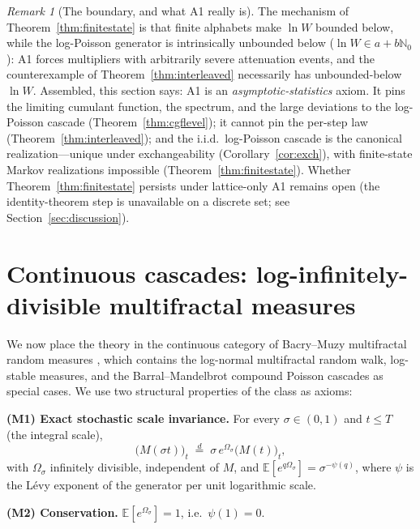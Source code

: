 \documentclass[12pt]{amsart}
\theoremstyle{definition}
\theoremstyle{remark}
\newtheorem*{remark}{Remark}
\begin{document}
\begin{remark}[The boundary, and what A1 really is]
The mechanism of Theorem~\ref{thm:finitestate} is that finite
alphabets make $\ln W$ bounded below, while the log-Poisson
generator is intrinsically unbounded below ($\ln W \in a +
b\mathbb{N}_0$): A1 forces multipliers with arbitrarily severe
attenuation events, and the counterexample of
Theorem~\ref{thm:interleaved} necessarily has unbounded-below
$\ln W$.  Assembled, this section says: A1 is an
\emph{asymptotic-statistics} axiom.  It pins the limiting cumulant
function, the spectrum, and the large deviations to the log-Poisson
cascade (Theorem~\ref{thm:cgflevel}); it cannot pin the per-step law
(Theorem~\ref{thm:interleaved}); and the i.i.d.\ log-Poisson cascade
is the canonical realization---unique under exchangeability
(Corollary~\ref{cor:exch}), with finite-state Markov realizations
impossible (Theorem~\ref{thm:finitestate}).  Whether
Theorem~\ref{thm:finitestate} persists under lattice-only A1
remains open (the identity-theorem step is unavailable on a discrete
set; see Section~\ref{sec:discussion}).
\end{remark}


\section{Continuous cascades: log-infinitely-divisible multifractal
measures}
\label{sec:mrm}

We now place the theory in the continuous category of Bacry--Muzy
multifractal random measures \cite{BM03,MB02}, which contains the
log-normal multifractal random walk, log-stable measures, and the
Barral--Mandelbrot compound Poisson cascades \cite{BM02} as special
cases.  We use two structural properties of the class as axioms:

\smallskip
\noindent\textbf{(M1) Exact stochastic scale invariance.}  For every
$\sigma \in (0,1)$ and $t \le T$ (the integral scale),
\[
  \bigl(M(\sigma t)\bigr)_t \;\stackrel{d}{=}\;
  \sigma\,e^{\Omega_\sigma}\bigl(M(t)\bigr)_t,
\]
with $\Omega_\sigma$ infinitely divisible, independent of $M$, and
$\mathbb{E}[e^{q\Omega_\sigma}] = \sigma^{-\psi(q)}$, where $\psi$
is the L\'evy exponent of the generator per unit logarithmic scale.

\smallskip
\noindent\textbf{(M2) Conservation.}  $\mathbb{E}[e^{\Omega_\sigma}]
= 1$, i.e.\ $\psi(1) = 0$.
\end{document}
